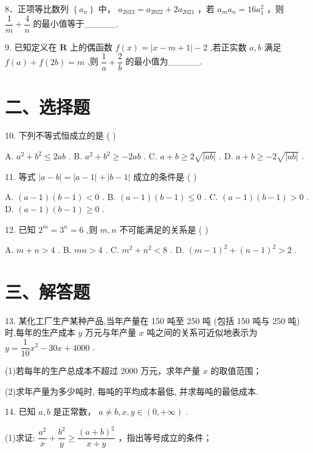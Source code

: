 8．正项等比数列 $\left\{  {a}_{n}\right\}$ 中， ${a}_{2023} = {a}_{2022} + 2{a}_{2021}$ ，若 ${a}_{m}{a}_{n} = {16}{a}_{1}^{2}$ ，则 $\dfrac{1}{m} + \dfrac{4}{n}$ 的最小值等于\_\_\_\_\_.

9. 已知定义在 $\mathbf{R}$ 上的偶函数 $f\left( x\right)  = \left| {x - m + 1}\right|  - 2$ ,若正实数 $a,b$ 满足 $f\left( a\right)  + f\left( {2b}\right)  = m$ ,则 $\dfrac{1}{a} + \dfrac{2}{b}$ 的最小值为\_\_\_\_\_.

\section*{二、选择题}

10. 下列不等式恒成立的是 ( )

A. ${a}^{2} + {b}^{2} \leq  {2ab}$ . B. ${a}^{2} + {b}^{2} \geq   - {2ab}$ . C. $a + b \geq  2\sqrt{\left| ab\right| }$ . D. $a + b \geq   - 2\sqrt{\left| ab\right| }$ .

11. 等式 $\left| {a - b}\right|  = \left| {a - 1}\right|  + \left| {b - 1}\right|$ 成立的条件是 ( )

A. $\left( {a - 1}\right) \left( {b - 1}\right)  < 0$ . B. $\left( {a - 1}\right) \left( {b - 1}\right)  \leq  0$ . C. $\left( {a - 1}\right) \left( {b - 1}\right)  > 0$ . D. $\left( {a - 1}\right) \left( {b - 1}\right)  \geq  0$ .

12. 已知 ${2}^{m} = {3}^{n} = 6$ ,则 $m,n$ 不可能满足的关系是 ( )

A. $m + n > 4$ . B. ${mn} > 4$ . C. ${m}^{2} + {n}^{2} < 8$ . D. ${\left( m - 1\right) }^{2} + {\left( n - 1\right) }^{2} > 2$ .

\section*{三、解答题}

13. 某化工厂生产某种产品,当年产量在 150 吨至 250 吨 (包括 150 吨与 250 吨) 时,每年的生产成本 $y$ 万元与年产量 $x$ 吨之间的关系可近似地表示为 $y = \dfrac{1}{10}{x}^{2} - {30x} + {4000}$ .

(1)若每年的生产总成本不超过 2000 万元，求年产量 $x$ 的取值范围；

(2)求年产量为多少吨时, 每吨的平均成本最低, 并求每吨的最低成本.

14. 已知 $a,b$ 是正常数， $a \neq  b,x,y \in  \left( {0, + \infty }\right)$ .

(1)求证: $\dfrac{{a}^{2}}{x} + \dfrac{{b}^{2}}{y} \geq  \dfrac{{\left( a + b\right) }^{2}}{x + y}$ ，指出等号成立的条件；

